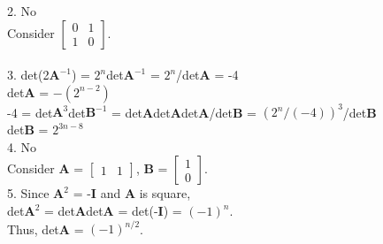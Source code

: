 \documentclass{article}
\begin{document}
    2. No\\
    Consider $\begin{bmatrix} 0 & 1\\ 1 & 0\end{bmatrix}.$ \\
    \\
    3. det(2$\textbf{A}^{-1}$) = $2^n$det$\textbf{A}^{-1}$ = $2^n$/det\textbf{A} = -4\\
    det\textbf{A} = $-(2^{n-2})$\\
    -4 = det$\textbf{A}^3$det$\textbf{B}^{-1}$ = det\textbf{A}det\textbf{A}det\textbf{A}/det\textbf{B} = $(2^n/(-4))^3$/det\textbf{B} \\
    det\textbf{B} = $2^{3n-8}$ \\

    4. No\\
    Consider \textbf{A} = $\begin{bmatrix} 1 & 1\end{bmatrix}$, \textbf{B} = $\begin{bmatrix} 1 \\ 0\end{bmatrix}$. \\

    5. Since $\textbf{A}^2$ = -\textbf{I} and \textbf{A} is square, \\
    det$\textbf{A}^2$ = det\textbf{A}det\textbf{A} = det(-\textbf{I}) = $(-1)^n$. \\
    Thus, det\textbf{A} = $(-1)^{n/2}$. \\
\end{document}
